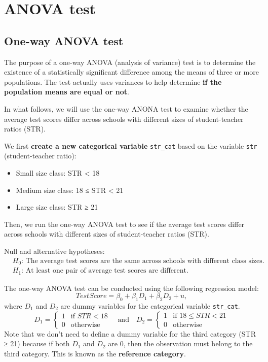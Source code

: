 \documentclass[
  12pt,
  a4paper,
]{scrbook}
\providecommand{\tightlist}{%
  \setlength{\itemsep}{0pt}\setlength{\parskip}{0pt}}
\renewcommand{\tightlist}{\setlength{\itemsep}{0.5\baselineskip}\setlength{\parskip}{0.2\baselineskip}}
\theoremstyle{plain}
\theoremstyle{definition}
\theoremstyle{remark}
\begin{document}
\section{ANOVA test}\label{anova-test}

\subsection{One-way ANOVA test}\label{one-way-anova-test}

The purpose of a one-way ANOVA (analysis of variance) test is to
determine the existence of a statistically significant difference among
the means of three or more populations. The test actually uses variances
to help determine {\textbf{if the population means are equal or not}}.

In what follows, we will use the one-way ANONA test to examine whether
the average test scores differ across schools with different sizes of
student-teacher ratios (STR).

We first \textbf{create a new categorical variable} \texttt{str\_cat}
based on the variable \texttt{str} (student-teacher ratio):

\begin{itemize}
\tightlist
\item
  Small size class: STR \textless{} 18
\item
  Medium size class: 18 ≤ STR \textless{} 21
\item
  Large size class: STR ≥ 21
\end{itemize}

Then, we run the one-way ANOVA test to see if the average test scores
differ across schools with different sizes of student-teacher ratios
(STR).

Null and alternative hypotheses: \[
\begin{split}
&\text{$H_0$: The average test scores are the same across schools with different class sizes.} \\
&\text{$H_1$: At least one pair of average test scores are different.}
\end{split}
\]

The one-way ANOVA test can be conducted using the following regression
model: \[
TestScore = \beta_0 + \beta_1 D_1 + \beta_2 D_2 + u,
\] where \(D_1\) and \(D_2\) are dummy variables for the categorical
variable \texttt{str\_cat}. \[
D_1 = 
\begin{cases}
    1 & \text{if $STR<18$} \\
    0 & \text{otherwise}
\end{cases} \quad \text{and} \quad
D_2 = 
\begin{cases}
    1 & \text{if $18 \leq STR < 21$} \\
    0 & \text{otherwise}
\end{cases}
\] Note that we don't need to define a dummy variable for the third
category (STR ≥ 21) because if both \(D_1\) and \(D_2\) are 0, then the
observation must belong to the third category. This is known as the
{\textbf{reference category}}.
\end{document}
